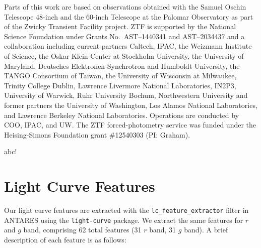 \documentclass[twocolumn]{aastex63}
\begin{document}
Parts of this work are based on observations obtained with the Samuel Oschin Telescope 48-inch and the 60-inch Telescope at the Palomar Observatory as part of the Zwicky Transient Facility project. ZTF is supported by the National Science Foundation under Grants No.\ AST--1440341 and AST--2034437 and a collaboration including current partners Caltech, IPAC, the Weizmann Institute of Science, the Oskar Klein Center at Stockholm University, the University of Maryland, Deutsches Elektronen-Synchrotron and Humboldt University, the TANGO Consortium of Taiwan, the University of Wisconsin at Milwaukee, Trinity College Dublin, Lawrence Livermore National Laboratories, IN2P3, University of Warwick, Ruhr University Bochum, Northwestern University and former partners the University of Washington, Los Alamos National Laboratories, and Lawrence Berkeley National Laboratories. Operations are conducted by COO, IPAC, and UW.
The ZTF forced-photometry service was funded under the Heising-Simons Foundation grant \#12540303 (PI: Graham). 

abc!


{}


\appendix


\section{Light Curve Features}
\label{appx:lc_features}


\renewcommand{\thefigure}{A.\arabic{figure}}
\setcounter{figure}{0}
\renewcommand{\thetable}{A.\arabic{table}} \setcounter{table}{0}

Our light curve features are extracted with the \texttt{lc\_feature\_extractor} filter in ANTARES using the \texttt{light-curve} package. We extract the same features for $r$ and $g$ band, comprising 62 total features (31 $r$ band, 31 $g$ band). A brief description of each feature is as follows:
\end{document}
